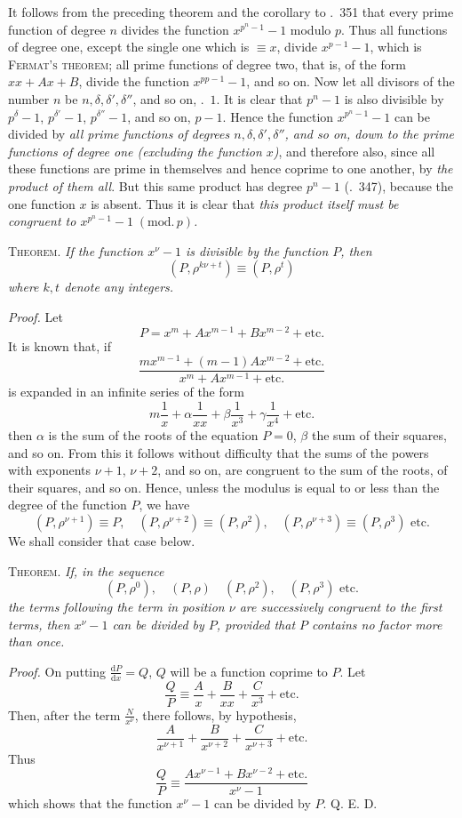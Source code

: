 It follows from the preceding theorem and the corollary to \textsection.\ 351 that every prime function of degree $n$ divides the function $x^{p^n-1}-1$ modulo $p$. Thus all functions of degree one, except the single one which is $\equiv x$, divide $x^{p-1}-1$, which is \textsc{Fermat's theorem}; all prime functions of degree two, that is, of the form $xx+Ax+B$, divide the function $x^{pp-1}-1$, and so on. Now let all divisors of the number $n$ be $n,\delta,\delta',\delta''$, and so on, .\ $1$. It is clear that $p^n-1$ is also divisible by $p^\delta-1$, $p^{\delta'}-1$, $p^{\delta''}-1$, and so on, $p-1$. Hence the function $x^{p^n-1}-1$ can be divided by \emph{all prime functions of degrees $n,\delta,\delta',\delta''$, and so on, down to the prime functions of degree one (excluding the function $x$)}, and therefore also, since all these functions are prime in themselves and hence coprime to one another, by \emph{the product of them all}. But this same product has degree $p^n-1$ (\textsection.\ 347), because the one function $x$ is absent. Thus it is clear that \emph{this product itself must be congruent to $x^{p^n-1}-1\;(\mathrm{mod.}\,p)$.}

\textsc{Theorem.} \emph{If the function $x^\nu-1$ is divisible by the function $P$, then}
\[
(P,\rho^{k\nu+t})\equiv(P,\rho^t)
\]
\emph{where $k,t$ denote any integers.}

\emph{Proof.} Let
\[
P=x^m+Ax^{m-1}+Bx^{m-2}+\text{etc.}
\]
It is known that, if
\[
\frac{mx^{m-1}+(m-1)Ax^{m-2}+\text{etc.}}{x^m+Ax^{m-1}+\text{etc.}}
\]
is expanded in an infinite series of the form
\[
m\frac1x+\alpha\frac1{xx}+\beta\frac1{x^3}+\gamma\frac1{x^4}+\text{etc.}
\]
then $\alpha$ is the sum of the roots of the equation $P=0$, $\beta$ the sum of their squares, and so on. From this it follows without difficulty that the sums of the powers with exponents $\nu+1$, $\nu+2$, and so on, are congruent to the sum of the roots, of their squares, and so on. Hence, unless the modulus is equal to or less than the degree of the function $P$, we have
\[
(P,\rho^{\nu+1})\equiv P,\quad(P,\rho^{\nu+2})\equiv(P,\rho^2),\quad(P,\rho^{\nu+3})\equiv(P,\rho^3)\text{ etc.}
\]
We shall consider that case below.

\textsc{Theorem.} \emph{If, in the sequence}
\[
(P,\rho^0),\quad(P,\rho)\quad(P,\rho^2),\quad(P,\rho^3)\text{ etc.}
\]
\emph{the terms following the term in position $\nu$ are successively congruent to the first terms, then $x^\nu-1$ can be divided by $P$, provided that $P$ contains no factor more than once.}

\emph{Proof.} On putting $\frac{\mathrm{d}P}{\mathrm{d}x}=Q$, $Q$ will be a function coprime to $P$. Let
\[
\frac QP\equiv\frac Ax+\frac B{xx}+\frac C{x^3}+\text{etc.}
\]
Then, after the term $\frac N{x^\nu}$, there follows, by hypothesis,
\[
\frac A{x^{\nu+1}}+\frac B{x^{\nu+2}}+\frac C{x^{\nu+3}}+\text{etc.}
\]
Thus
\[
\frac QP\equiv\frac{Ax^{\nu-1}+Bx^{\nu-2}+\text{etc.}}{x^\nu-1}
\]
which shows that the function $x^\nu-1$ can be divided by $P$. Q. E. D.
